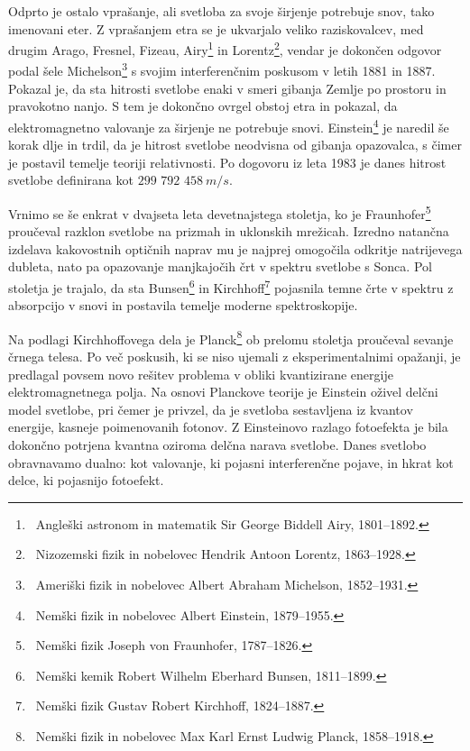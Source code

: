 Odprto je ostalo vprašanje, ali svetloba za svoje širjenje 
potrebuje snov, tako imenovani eter. Z vprašanjem etra se je 
ukvarjalo veliko raziskovalcev, med drugim Arago, Fresnel, Fizeau, 
Airy\footnote{~Angleški astronom in matematik Sir George Biddell Airy, 1801--1892.} 
in Lorentz\footnote{~Nizozemski fizik in nobelovec Hendrik Antoon Lorentz, 1863--1928.},
vendar je dokončen odgovor podal šele Michelson\footnote{~Ameriški fizik in nobelovec Albert
Abraham Michelson, 1852--1931.} s svojim 
interferenčnim poskusom v letih 1881 in 1887. Pokazal je, da
sta hitrosti svetlobe enaki v smeri gibanja Zemlje po prostoru in 
pravokotno nanjo. S tem je dokončno ovrgel obstoj etra in pokazal, 
da elektromagnetno valovanje za širjenje ne potrebuje snovi. 
Einstein\footnote{~Nemški fizik in nobelovec Albert Einstein, 1879--1955.} 
je naredil še korak dlje in trdil, da je hitrost 
svetlobe neodvisna od gibanja opazovalca, s čimer je postavil temelje 
teoriji relativnosti. Po dogovoru iz leta 1983 je danes 
hitrost svetlobe  definirana kot $299\,\,792\,\,458~\si{m/s}$. 

Vrnimo se še enkrat v dvajseta leta devetnajstega stoletja, ko je 
Fraunhofer\footnote{~Nemški fizik Joseph von Fraunhofer, 1787--1826.}
proučeval razklon svetlobe na prizmah in uklonskih mrežicah. Izredno
natančna izdelava kakovostnih optičnih naprav mu je najprej omogočila odkritje 
natrijevega dubleta, nato pa opazovanje manjkajočih črt v spektru
svetlobe s Sonca. Pol stoletja je trajalo, da
sta Bunsen\footnote{~Nemški kemik Robert Wilhelm Eberhard Bunsen, 1811--1899.}
in Kirchhoff\footnote{~Nemški fizik Gustav Robert Kirchhoff, 1824--1887.}
pojasnila temne črte v spektru z absorpcijo v snovi in postavila temelje
moderne spektroskopije.

Na podlagi Kirchhoffovega dela je Planck\footnote{~Nemški fizik in nobelovec
Max Karl Ernst Ludwig Planck, 1858--1918.} ob prelomu stoletja
proučeval sevanje črnega telesa. Po več poskusih, ki se niso
ujemali z eksperimentalnimi opažanji, je predlagal povsem novo rešitev problema
v obliki kvantizirane energije elektromagnetnega polja. Na osnovi
Planckove teorije je Einstein oživel delčni model svetlobe, pri čemer
je privzel, da je svetloba sestavljena iz kvantov energije, kasneje 
poimenovanih fotonov. Z Einsteinovo razlago fotoefekta je bila dokončno
potrjena kvantna oziroma delčna narava svetlobe. Danes svetlobo obravnavamo
dualno: kot valovanje, ki pojasni interferenčne 
pojave, in hkrat kot delce, ki pojasnijo fotoefekt. 


